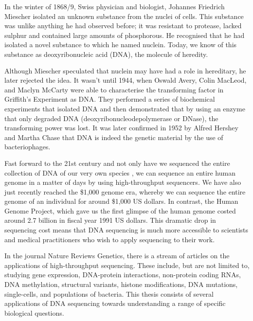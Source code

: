 \setlength{\parskip}{\baselineskip}%
\setlength{\parindent}{0pt}%

In the winter of 1868/9, Swiss physician and biologist, Johannes Friedrich Miescher isolated an unknown substance from the nuclei of cells\cite{dahm2008discovering}. This substance was unlike anything he had observed before; it was resistant to protease, lacked sulphur and contained large amounts of phosphorous. He recognised that he had isolated a novel substance to which he named nuclein. Today, we know of this substance as deoxyribonucleic acid (DNA), the molecule of heredity.

Although Miescher speculated that nuclein may have had a role in hereditary, he later rejected the idea. It wasn't until 1944, when Oswald Avery, Colin MacLeod, and Maclyn McCarty were able to characterise the transforming factor in Griffith's Experiment\cite{griffith1928significance} as DNA\cite{avery1944studies}. They performed a series of biochemical experiments that isolated DNA and then demonstrated that by using an enzyme that only degraded DNA (deoxyribonucleodepolymerase or DNase), the transforming power was lost. It was later confirmed in 1952 by Alfred Hershey and Martha Chase that DNA is indeed the genetic material by the use of bacteriophages\cite{hershey1952independent}.

Fast forward to the 21st century and not only have we sequenced the entire collection of DNA of our very own species \cite{venter2001sequence, lander2001initial}, we can sequence an entire human genome in a matter of days by using high-throughput sequencers. We have also just recently reached the \$1,000 genome era, whereby we can sequence the entire genome of an individual for around \$1,000 US dollars. In contrast, the Human Genome Project, which gave us the first glimpse of the human genome costed around 2.7 billion in fiscal year 1991 US dollars\cite{nhgri2010cost}. This dramatic drop in sequencing cost means that DNA sequencing is much more accessible to scientists and medical practitioners who wish to apply sequencing to their work.

In the journal Nature Reviews Genetics, there is a stream of articles on the applications of high-throughput sequencing\cite{applicationsofsequencing}. These include, but are not limited to, studying gene expression, DNA-protein interactions, non-protein coding RNAs, DNA methylation, structural variants, histone modifications, DNA mutations, single-cells, and populations of bacteria. This thesis consists of several applications of DNA sequencing towards understanding a range of specific biological questions.

